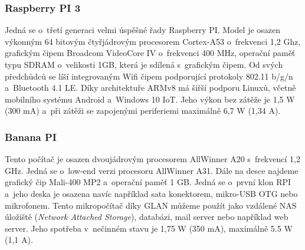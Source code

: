 \subsubsection*{Raspberry PI 3}
Jedná se o~třetí generaci velmi úspěšné řady Raspberry PI. Model je osazen výkonným 64 bitovým čtyřjádrovým procesorem Cortex-A53 o~frekvenci 1,2 Ghz, grafickým čipem Broadcom VideoCore IV o~frekvenci 400 MHz, operační paměť typu SDRAM o~velikosti 1GB, která je sdílená s~grafickým čipem. Od svých předchůdců se líší integrovaným Wifi čipem podporující protokoly 802.11 b/g/n a~Bluetooth 4.1 LE. Díky architektuře ARMv8 má šiřší podporu Linuxů, včetně mobilního systému Android a~Windows 10 IoT. Jeho výkon bez zátěže je 1,5 W (300 mA) a~při zátěži se zapojenými periferiemi maximálně 6,7 W (1,34 A).

\subsubsection*{Banana PI}
Tento počítač je osazen dvoujádrovým procesorem AllWinner A20 s~frekvencí 1,2 GHz. Jedná se o~low-end verzi procesoru AllWinner A31. Dále na desce najdeme grafický čip Mali-400 MP2 a~operační paměť 1 GB. Jedná se o~první klon RPI a~jeho deska je osazena navíc například sata konektorem, mikro-USB OTG nebo mikrofonem. Tento mikropočítač díky GLAN můžeme použít jako vzdálené NAS úložiště (\textit{Network Attached Storage}), databázi, mail server nebo například web server. Jeho spotřeba v~nečinném stavu je 1,75 W (350 mA), maximálně 5.5 W (1,1 A).

